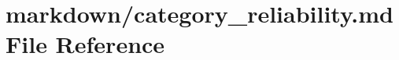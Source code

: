 \hypertarget{category__reliability_8md}{}\section{markdown/category\+\_\+reliability.md File Reference}
\label{category__reliability_8md}
